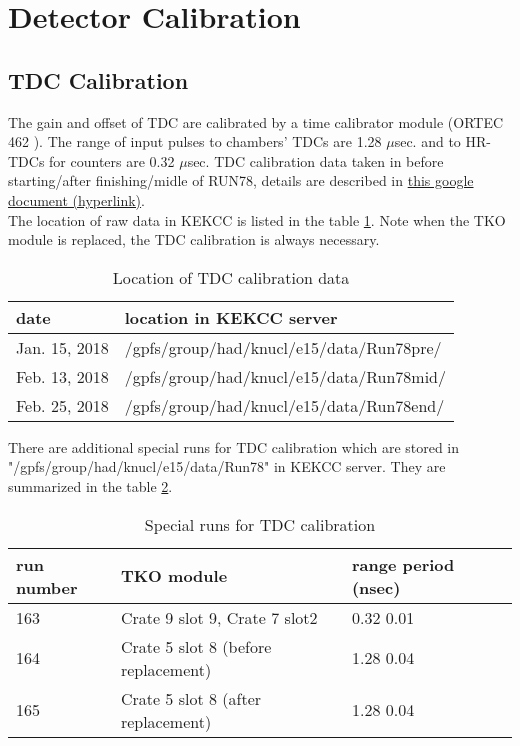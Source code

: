 \section{Detector Calibration}
\label{sec:calib}

\subsection{TDC Calibration}
\label{subsec:tdccal}
The gain and offset of TDC are calibrated by a time calibrator module (ORTEC 462 \cite{ortec462}). 
The range of input pulses to chambers' TDCs are 1.28 $\mu$sec. and to HR-TDCs for counters are 0.32 $\mu$sec.
TDC calibration data taken in before starting/after finishing/midle of RUN78, details are described in 
\href{https://docs.google.com/spreadsheets/d/15vT7yNGUVHVp4Qfaj9-NdteIv2QQYKMvdyXu3NPuM2E/edit#gid=2014028108}{this google document (hyperlink)}.\\
The location of raw data in KEKCC is listed in the table \ref{tab:tdccal}.
Note when the TKO module is replaced, the TDC calibration is always necessary.

\begin{table}[h]
\centering
\begin{tabular}{l|l}
date & location in KEKCC server \\\hline
Jan. 15, 2018 & /gpfs/group/had/knucl/e15/data/Run78pre/   \\
Feb. 13, 2018 & /gpfs/group/had/knucl/e15/data/Run78mid/   \\
Feb. 25, 2018 & /gpfs/group/had/knucl/e15/data/Run78end/   \\
\end{tabular}
\caption{\label{tab:tdccal}Location of TDC calibration data}
\end{table}


There are additional special runs for TDC calibration which are stored in\\ 
"/gpfs/group/had/knucl/e15/data/Run78" in KEKCC server. They are summarized in the table \ref{tab:tdccaladd}.

\begin{table}[h]
\centering
\begin{tabular}{l|l|l|l}
run number & TKO module & range  period (nsec)\\\hline
163 & Crate 9 slot 9, Crate 7 slot2 & 0.32  0.01 \\
164 & Crate 5 slot 8 (before replacement) & 1.28 0.04 \\
165 & Crate 5 slot 8 (after replacement) & 1.28 0.04 
\end{tabular}
\caption{\label{tab:tdccaladd}Special runs for TDC calibration}
\end{table}


